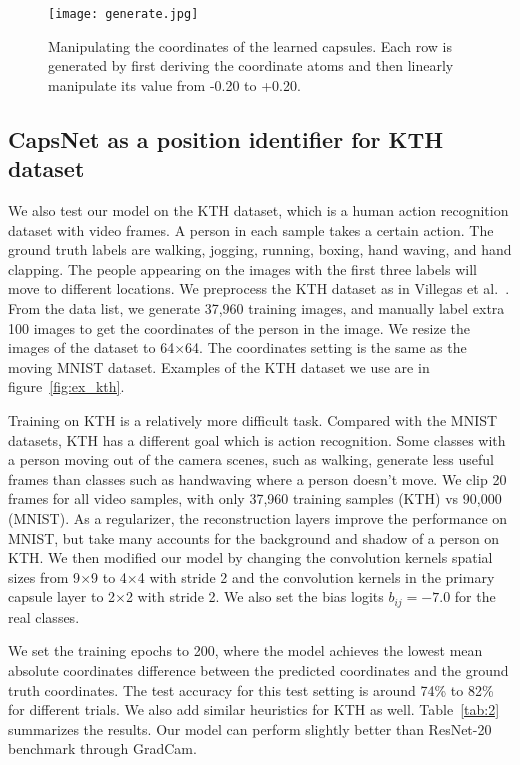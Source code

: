 \documentclass{article}
\begin{document}
\begin{figure}
\centering
\texttt{[image: generate.jpg]}
\caption{\label{fig:manipulate} Manipulating the coordinates of the learned capsules. Each row is generated by first deriving the coordinate atoms and then linearly manipulate its value from -0.20 to +0.20.}
\end{figure}

\subsection{CapsNet as a position identifier for KTH dataset ~\label{sec:exp_kth}}
We also test our model on the KTH dataset, which is a human action recognition dataset with video frames. A person in each sample takes a certain action. The ground truth labels are walking, jogging, running, boxing, hand waving, and hand clapping. The people appearing on the images with the first three labels will move to different locations. We preprocess the KTH dataset as in Villegas et al.~\cite{villegas2017decomposing}. From the data list, we generate 37,960 training images, and manually label extra 100 images to get the coordinates of the person in the image. We resize the images of the dataset to 64$\times$64. The coordinates setting is the same as the moving MNIST dataset. Examples of the KTH dataset we use are in figure~\ref{fig:ex_kth}.

Training on KTH is a relatively more difficult task. Compared with the MNIST datasets, KTH has a different goal which is action recognition. Some classes with a person moving out of the camera scenes, such as walking, generate less useful frames than classes such as handwaving where a person doesn't move. We clip 20 frames for all video samples, with only 37,960 training samples (KTH) vs 90,000 (MNIST). As a regularizer, the reconstruction layers improve the performance on MNIST, but take many accounts for the background and shadow of a person on KTH\@. We then modified our model by changing the convolution kernels spatial sizes from 9$\times$9 to 4$\times$4 with stride 2 and the convolution kernels in the primary capsule layer to 2$\times$2 with stride 2. We also set the bias logits $b_{ij}=-7.0$ for the real classes.

We set the training epochs to 200, where the model achieves the lowest mean absolute coordinates difference between the predicted coordinates and the ground truth coordinates. The test accuracy for this test setting is around 74\% to 82\% for different trials. We also add similar heuristics for KTH as well. Table~\ref{tab:2} summarizes the results. Our model can perform slightly better than ResNet-20 benchmark through GradCam.
\end{document}
